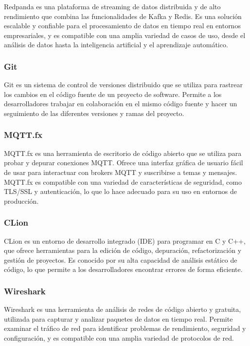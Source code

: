 Redpanda \citep{redpanda} es una plataforma de streaming de datos distribuida y de alto rendimiento que combina las funcionalidades de Kafka y Redis. Es una solución escalable y confiable para el procesamiento de datos en tiempo real en entornos empresariales, y es compatible con una amplia variedad de casos de uso, desde el análisis de datos hasta la inteligencia artificial y el aprendizaje automático.


\subsubsection{Git}

Git \citep{git} es un sistema de control de versiones distribuido que se utiliza para rastrear los cambios en el código fuente de un proyecto de software. Permite a los desarrolladores trabajar en colaboración en el mismo código fuente y hacer un seguimiento de las diferentes versiones y ramas del proyecto. 


\subsubsection{MQTT.fx}

MQTT.fx \citep{mqtt-fx} es una herramienta de escritorio de código abierto que se utiliza para probar y depurar conexiones MQTT. Ofrece una interfaz gráfica de usuario fácil de usar para interactuar con brokers MQTT y suscribirse a temas y mensajes. MQTT.fx es compatible con una variedad de características de seguridad, como TLS/SSL y autenticación, lo que lo hace adecuado para su uso en entornos de producción.


\subsubsection{CLion}

CLion \citep{clion} es un entorno de desarrollo integrado (IDE) para programar en C y C++, que ofrece herramientas para la edición de código, depuración, refactorización y gestión de proyectos. Es conocido por su alta capacidad de análisis estático de código, lo que permite a los desarrolladores encontrar errores de forma eficiente.


\subsubsection{Wireshark}

Wireshark \citep{wireshark} es una herramienta de análisis de redes de código abierto y gratuita, utilizada para capturar y analizar paquetes de datos en tiempo real. Permite examinar el tráfico de red para identificar problemas de rendimiento, seguridad y configuración, y es compatible con una amplia variedad de protocolos de red.


